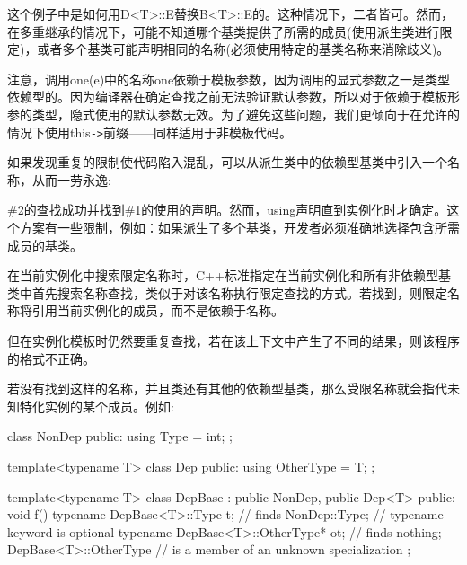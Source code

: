 这个例子中是如何用D<T>::E替换B<T>::E的。这种情况下，二者皆可。然而，在多重继承的情况下，可能不知道哪个基类提供了所需的成员(使用派生类进行限定)，或者多个基类可能声明相同的名称(必须使用特定的基类名称来消除歧义)。

注意，调用one(e)中的名称one依赖于模板参数，因为调用的显式参数之一是类型依赖型的。因为编译器在确定查找之前无法验证默认参数，所以对于依赖于模板形参的类型，隐式使用的默认参数无效。为了避免这些问题，我们更倾向于在允许的情况下使用this\texttt{->}前缀——同样适用于非模板代码。

如果发现重复的限制使代码陷入混乱，可以从派生类中的依赖型基类中引入一个名称，从而一劳永逸:


\#2的查找成功并找到\#1的使用的声明。然而，using声明直到实例化时才确定。这个方案有一些限制，例如：如果派生了多个基类，开发者必须准确地选择包含所需成员的基类。

在当前实例化中搜索限定名称时，C++标准指定在当前实例化和所有非依赖型基类中首先搜索名称查找，类似于对该名称执行限定查找的方式。若找到，则限定名称将引用当前实例化的成员，而不是依赖于名称。

\begin{notice}
但在实例化模板时仍然要重复查找，若在该上下文中产生了不同的结果，则该程序的格式不正确。
\end{notice}

若没有找到这样的名称，并且类还有其他的依赖型基类，那么受限名称就会指代未知特化实例的某个成员。例如:

\begin{cpp}
class NonDep {
	public:
	using Type = int;
};

template<typename T>
class Dep {
	public:
	using OtherType = T;
};

template<typename T>
class DepBase : public NonDep, public Dep<T> {
	public:
	void f() {
		typename DepBase<T>::Type t; // finds NonDep::Type;
		// typename keyword is optional
		typename DepBase<T>::OtherType* ot; // finds nothing; DepBase<T>::OtherType
		// is a member of an unknown specialization
	}
};
\end{cpp}























